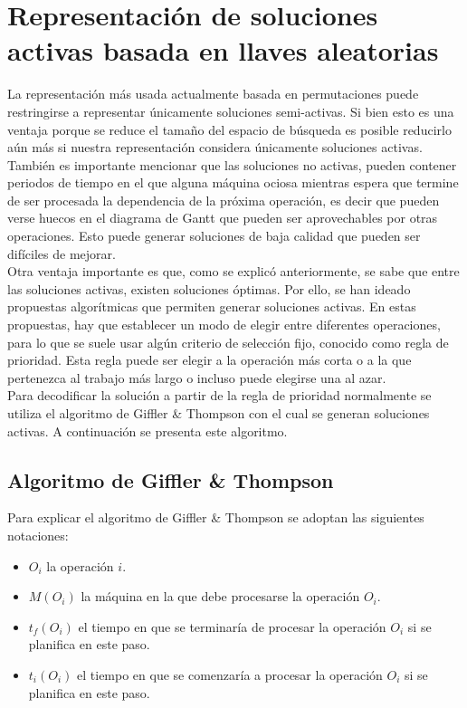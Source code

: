 \section{Representación de soluciones activas basada en llaves aleatorias}
La representación más usada actualmente basada en permutaciones puede restringirse a representar únicamente soluciones semi-activas. Si bien esto es una ventaja porque se reduce el tamaño del espacio de búsqueda es posible reducirlo aún más si nuestra representación considera únicamente soluciones activas. 
%
También es importante mencionar que las soluciones no activas, pueden contener periodos de tiempo en el que alguna máquina ociosa mientras espera que termine de ser procesada la dependencia de la próxima operación, es decir que pueden verse huecos en el diagrama de Gantt que pueden ser aprovechables por otras operaciones. Esto puede generar soluciones de baja calidad que pueden ser difíciles de mejorar.\\
%
Otra ventaja importante es que, como se explicó anteriormente, se sabe que entre las soluciones activas, existen soluciones óptimas. Por ello, se han ideado propuestas algorítmicas que permiten generar soluciones activas. En estas propuestas, hay que establecer un modo de elegir entre diferentes operaciones, para lo que se suele usar algún criterio de selección fijo, conocido como regla de prioridad. Esta regla puede ser elegir a la operación más corta o a la que pertenezca al trabajo más largo o incluso puede elegirse una al azar.\\
%
Para decodificar la solución a partir de la regla de prioridad normalmente se utiliza el algoritmo de Giffler \& Thompson \cite{Giffler1960} con el cual se generan 
soluciones activas. A continuación se presenta este algoritmo.

\subsection{Algoritmo de Giffler \& Thompson}
Para explicar el algoritmo de Giffler \& Thompson se adoptan las siguientes notaciones:
\begin{itemize}
    \item $O_i$ la operación $i$.
    \item $M(O_i)$ la máquina en la que debe procesarse la operación $O_i$.
    \item $t_f(O_i)$ el tiempo en que se terminaría de procesar la operación $O_i$ si se planifica en este paso.
    \item $t_i(O_i)$ el tiempo en que se comenzaría a procesar la operación $O_i$ si se planifica en este paso.
\end{itemize}

